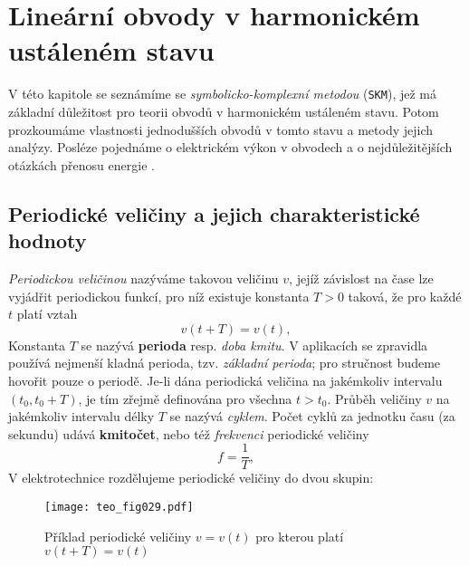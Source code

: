 \chapter[Harmonické obvody]{Lineární obvody v harmonickém ustáleném stavu}


  V této kapitole se seznámíme se \emph{symbolicko-komplexní metodou} (\texttt{SKM}), jež má
  základní důležitost pro teorii obvodů v harmonickém ustáleném stavu. Potom prozkoumáme vlastnosti
  jednodušších obvodů v tomto stavu a metody jejich analýzy. Posléze pojednáme o elektrickém výkon
  v obvodech a o nejdůležitějších otázkách přenosu energie \cite[s.~60]{Mayer1975}.
  
  \section{Periodické veličiny a jejich charakteristické hodnoty}
    \emph{Periodickou veličinou} nazýváme takovou veličinu $v$, jejíž závislost na čase lze
    vyjádřit periodickou funkcí, pro níž existuje konstanta $T>0$ taková, že pro každé $t$ platí
    vztah
    \begin{equation}\label{TEO:eq_harm01}
      v(t+T) = v(t),    
    \end{equation}  
    Konstanta $T$ se nazývá \textbf{perioda} resp. \emph{doba kmitu}. V aplikacích se zpravidla
    používá nejmenší kladná perioda, tzv. \emph{základní perioda}; pro stručnost budeme hovořit
    pouze o periodě. Je-li dána periodická veličina na jakémkoliv intervalu $(t_0, t_0+T)$, je tím
    zřejmě definována pro všechna $t>t_0$. Průběh veličiny $v$ na jakémkoliv intervalu délky $T$ se
    nazývá \emph{cyklem}. Počet cyklů za jednotku času (za sekundu) udává \textbf{kmitočet}, nebo
    též \emph{frekvenci} periodické veličiny
    \begin{equation}\label{TEO:eq_harm02}
      f = \frac{1}{T},
    \end{equation}
    V elektrotechnice rozdělujeme periodické veličiny do dvou skupin:
    \begin{figure}[ht!] %
       \centering
       \texttt{[image: teo\_fig029.pdf]}
       \caption{Příklad periodické veličiny $v=v(t)$ pro kterou platí $v(t+T)=v(t)$}
       \label{teo:fig029}
    \end{figure}

